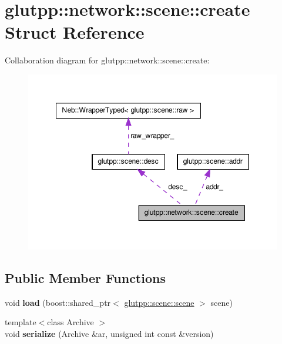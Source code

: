 \hypertarget{structglutpp_1_1network_1_1scene_1_1create}{\section{glutpp\-:\-:network\-:\-:scene\-:\-:create \-Struct \-Reference}
\label{structglutpp_1_1network_1_1scene_1_1create}
}


\-Collaboration diagram for glutpp\-:\-:network\-:\-:scene\-:\-:create\-:\nopagebreak
\begin{figure}[H]
\begin{center}
\leavevmode
\includegraphics[width=350pt]{structglutpp_1_1network_1_1scene_1_1create__coll__graph}
\end{center}
\end{figure}
\subsection*{\-Public \-Member \-Functions}
\begin{DoxyCompactItemize}
\item 
\hypertarget{structglutpp_1_1network_1_1scene_1_1create_aa908a0cb6ab7b3ce7ec3d2db9017aa87}{void {\bfseries load} (boost\-::shared\-\_\-ptr$<$ \hyperlink{classglutpp_1_1scene_1_1scene}{glutpp\-::scene\-::scene} $>$ scene)}\label{structglutpp_1_1network_1_1scene_1_1create_aa908a0cb6ab7b3ce7ec3d2db9017aa87}

\item 
\hypertarget{structglutpp_1_1network_1_1scene_1_1create_a17f38bf631168fcfdd88f301917339c8}{{\footnotesize template$<$class Archive $>$ }\\void {\bfseries serialize} (\-Archive \&ar, unsigned int const \&version)}\label{structglutpp_1_1network_1_1scene_1_1create_a17f38bf631168fcfdd88f301917339c8}

\end{DoxyCompactItemize}
